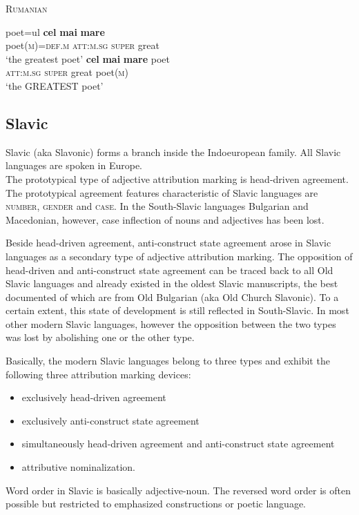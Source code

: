 \begin{exe}
\ex \textsc{Rumanian} \citep[93–94]{beyer-etal1987}
\begin{xlist}
\ex	\label{rum def comp}%
\gll	poet=ul \textbf{cel} \textbf{mai} \textbf{mare}\\
	poet(\textsc{m})=\textsc{def.m} \textsc{att:m.sg} \textsc{super} great\\
\glt	‘the greatest poet’
\ex	\label{rum def sup}
\gll	\textbf{cel} \textbf{mai} \textbf{mare} poet\\
	\textsc{att:m.sg} \textsc{super} great poet(\textsc{m})\\
\glt	‘the GREATEST poet’
\end{xlist}
\end{exe}

\subsection{Sla\-vic} \label{slavic synchr}
Sla\-vic (aka Slavonic) forms a branch inside the Indoeuropean family. All Sla\-vic languages are spoken in Europe.\\

\noindent The prototypical type of adjective attribution marking is head-driven agreement. The prototypical agreement features characteristic of Sla\-vic languages are \textsc{number}, \textsc{gender} and \textsc{case}. In the South-Sla\-vic languages Bulgarian and Macedonian, however, case inflection of nouns and adjectives has been lost.

Beside head-driven agreement, anti-construct state agreement arose in Sla\-vic languages as a secondary type of adjective attribution marking. The opposition of head-driven and anti-construct state agreement can be traced back to all Old Sla\-vic languages and already existed in the oldest Sla\-vic manuscripts, the best documented of which are from Old Bulgarian (aka Old Church Slavonic). To a certain extent, this state of development is still reflected in South-Sla\-vic. In most other modern Sla\-vic languages, however the opposition between the two types was lost by abolishing one or the other type.

Basically, the modern Sla\-vic languages belong to three types and exhibit the following three attribution marking devices:
\begin{itemize}
\item{exclusively head-driven agreement}
\item{exclusively anti-construct state agreement}
\item{simultaneously head-driven agreement and anti-construct state agreement}
\item{attributive nominalization.}
\end{itemize}
Word order in Sla\-vic is basically adjective-noun. The reversed word order is often possible but restricted to emphasized constructions or poetic language. 


